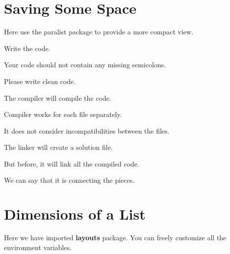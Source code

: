 \documentclass[12pt]{article}
\begin{document}
    \section*{Saving Some Space}
    Here use the paralist package to provide a more compact view.
    \begin{compactenum}
        \item Write the code.
            \begin{compactitem} %
            \item Your code should not contain any missing semicolons.
            \item Please write clean code.
            \end{compactitem}
        \item The compiler will compile the code.
            \begin{inparaenum} %
            \item Compiler works for each file separately.
            \item It does not consider incompatibilities between the files.
            \end{inparaenum}
        \item The linker will create a solution file.
            \begin{asparaenum} %
            \item But before, it will link all the compiled code.
            \item We can say that it is connecting the pieces.
            \end{asparaenum}
    \end{compactenum}

    \newpage

    \section*{Dimensions of a List}
    Here we have imported \textbf{layouts} package.
    \listdiagram
    You can freely customize all the environment variables.
\end{document}

